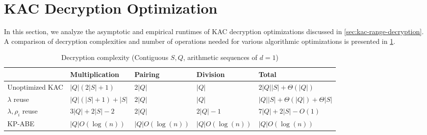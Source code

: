 \documentclass[hyp,a4paper,12pt,openbib]{socreport}
\renewcommand{\arraystretch}{1.2}
\begin{document}
\section{KAC Decryption Optimization}
\label{sec:range-analyze}
In this section, we analyze the asymptotic and empirical runtimes of KAC decryption optimizations discussed in \cref{sec:kac-range-decryption}. A comparison of decryption complexities and number of operations needed for various algorithmic optimizations is presented in \cref{tab:kac-optimize}.

\begin{table}[H]
\renewcommand{\arraystretch}{1.2}
    \begin{tabularx}{\textwidth}{| p{} | >{\raggedright\let\newline\\\arraybackslash\hspace{0pt}}X | >{\raggedright\let\newline\\\arraybackslash\hspace{0pt}} p{} | >{\raggedright\let\newline\\\arraybackslash\hspace{0pt}} p{} | >{\raggedright\let\newline\\\arraybackslash\hspace{0pt}}X |}
  
    \hline
    ~               & Multiplication & Pairing & Division   & Total                  \\ \hline
    Unoptimized KAC  & $|Q|(2|S|+1)$         & $2|Q| $          & $|Q|$           & $2|Q||S|+\Theta(|Q|)$       \\ \hline
    $\lambda$ reuse & $|Q|(|S|+1) + |S|$         & $2|Q| $          & $|Q|$           & $|Q||S|+\Theta(|Q|)+\Theta|S|$       \\ \hline    
    $\lambda, \rho_{i}$ reuse     & $3|Q| +2|S| -2$ & $2|Q|$         & $2|Q| - 1$  & $7|Q| + 2|S| - O(1)$ \\ \hline
    KP-ABE             &  $|Q|O(\log(n))$         & $|Q|O(\log(n))$   & $|Q|O(\log(n))$      & $|Q|O(\log(n))$                  \\ \hline
    
  \end{tabularx}

    \caption{Decryption complexity (Contiguous $S,Q$, arithmetic sequences of $d=1$)}
        \label{tab:kac-optimize}
\end{table}
\end{document}
